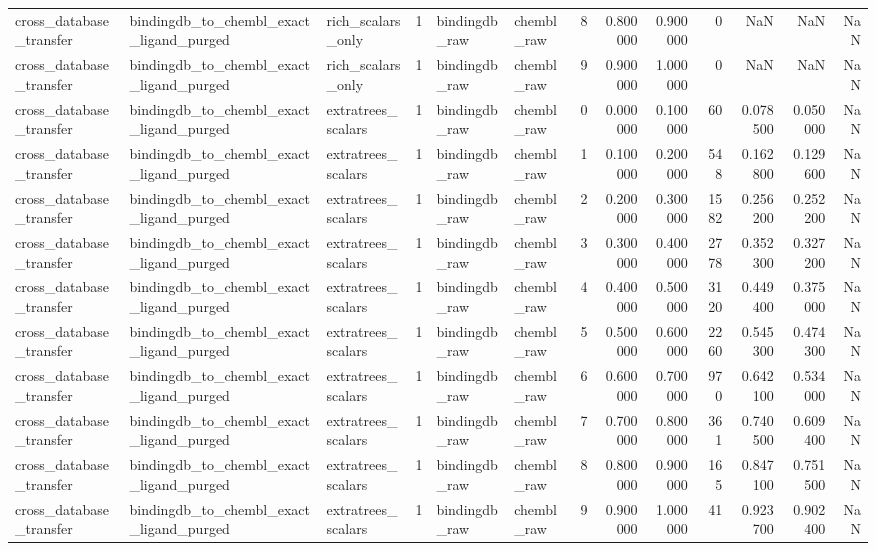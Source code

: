 \begin{longtable}{lllrllrrrrrrr}
cross\_database\_transfer & bindingdb\_to\_chembl\_exact\_ligand\_purged & rich\_scalars\_only & 1 & bindingdb\_raw & chembl\_raw & 8 & 0.800000 & 0.900000 & 0 & NaN & NaN & NaN \\
cross\_database\_transfer & bindingdb\_to\_chembl\_exact\_ligand\_purged & rich\_scalars\_only & 1 & bindingdb\_raw & chembl\_raw & 9 & 0.900000 & 1.000000 & 0 & NaN & NaN & NaN \\
cross\_database\_transfer & bindingdb\_to\_chembl\_exact\_ligand\_purged & extratrees\_scalars & 1 & bindingdb\_raw & chembl\_raw & 0 & 0.000000 & 0.100000 & 60 & 0.078500 & 0.050000 & NaN \\
cross\_database\_transfer & bindingdb\_to\_chembl\_exact\_ligand\_purged & extratrees\_scalars & 1 & bindingdb\_raw & chembl\_raw & 1 & 0.100000 & 0.200000 & 548 & 0.162800 & 0.129600 & NaN \\
cross\_database\_transfer & bindingdb\_to\_chembl\_exact\_ligand\_purged & extratrees\_scalars & 1 & bindingdb\_raw & chembl\_raw & 2 & 0.200000 & 0.300000 & 1582 & 0.256200 & 0.252200 & NaN \\
cross\_database\_transfer & bindingdb\_to\_chembl\_exact\_ligand\_purged & extratrees\_scalars & 1 & bindingdb\_raw & chembl\_raw & 3 & 0.300000 & 0.400000 & 2778 & 0.352300 & 0.327200 & NaN \\
cross\_database\_transfer & bindingdb\_to\_chembl\_exact\_ligand\_purged & extratrees\_scalars & 1 & bindingdb\_raw & chembl\_raw & 4 & 0.400000 & 0.500000 & 3120 & 0.449400 & 0.375000 & NaN \\
cross\_database\_transfer & bindingdb\_to\_chembl\_exact\_ligand\_purged & extratrees\_scalars & 1 & bindingdb\_raw & chembl\_raw & 5 & 0.500000 & 0.600000 & 2260 & 0.545300 & 0.474300 & NaN \\
cross\_database\_transfer & bindingdb\_to\_chembl\_exact\_ligand\_purged & extratrees\_scalars & 1 & bindingdb\_raw & chembl\_raw & 6 & 0.600000 & 0.700000 & 970 & 0.642100 & 0.534000 & NaN \\
cross\_database\_transfer & bindingdb\_to\_chembl\_exact\_ligand\_purged & extratrees\_scalars & 1 & bindingdb\_raw & chembl\_raw & 7 & 0.700000 & 0.800000 & 361 & 0.740500 & 0.609400 & NaN \\
cross\_database\_transfer & bindingdb\_to\_chembl\_exact\_ligand\_purged & extratrees\_scalars & 1 & bindingdb\_raw & chembl\_raw & 8 & 0.800000 & 0.900000 & 165 & 0.847100 & 0.751500 & NaN \\
cross\_database\_transfer & bindingdb\_to\_chembl\_exact\_ligand\_purged & extratrees\_scalars & 1 & bindingdb\_raw & chembl\_raw & 9 & 0.900000 & 1.000000 & 41 & 0.923700 & 0.902400 & NaN \\

\end{longtable}
